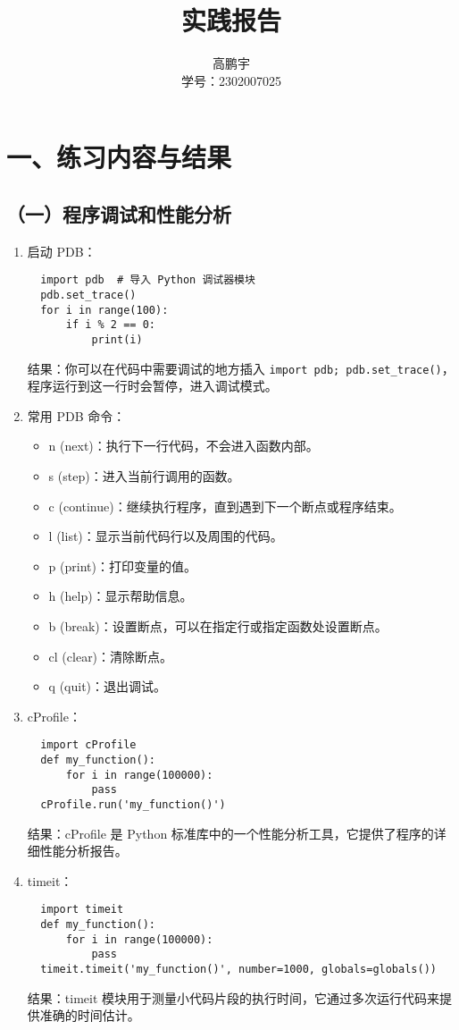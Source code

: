 \documentclass[UTF8]{ctexart}
\title{实践报告}
\author{高鹏宇\\ 学号：2302007025}
\date{}
\begin{document}
\maketitle

\section*{一、练习内容与结果}

\subsection*{（一）程序调试和性能分析}
\begin{enumerate}
  \item 启动 PDB：
  \begin{verbatim}
  import pdb  # 导入 Python 调试器模块
  pdb.set_trace()
  for i in range(100):
      if i % 2 == 0:
          print(i)
  \end{verbatim}
  结果：你可以在代码中需要调试的地方插入 \texttt{import pdb; pdb.set\_trace()}，程序运行到这一行时会暂停，进入调试模式。
  
  \item 常用 PDB 命令：
  \begin{itemize}
    \item n (next)：执行下一行代码，不会进入函数内部。
    \item s (step)：进入当前行调用的函数。
    \item c (continue)：继续执行程序，直到遇到下一个断点或程序结束。
    \item l (list)：显示当前代码行以及周围的代码。
    \item p (print)：打印变量的值。
    \item h (help)：显示帮助信息。
    \item b (break)：设置断点，可以在指定行或指定函数处设置断点。
    \item cl (clear)：清除断点。
    \item q (quit)：退出调试。
  \end{itemize}
  
  \item cProfile：
  \begin{verbatim}
  import cProfile
  def my_function():
      for i in range(100000):
          pass
  cProfile.run('my_function()')
  \end{verbatim}
  结果：cProfile 是 Python 标准库中的一个性能分析工具，它提供了程序的详细性能分析报告。
  
  \item timeit：
  \begin{verbatim}
  import timeit
  def my_function():
      for i in range(100000):
          pass
  timeit.timeit('my_function()', number=1000, globals=globals())
  \end{verbatim}
  结果：timeit 模块用于测量小代码片段的执行时间，它通过多次运行代码来提供准确的时间估计。
  

\end{enumerate}
\end{document}
